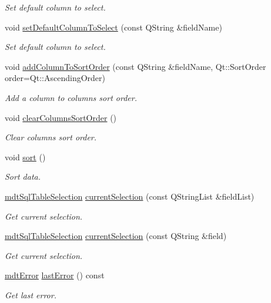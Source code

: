 \begin{DoxyCompactItemize}
\begin{DoxyCompactList}\small\item\em Set default column to select. \end{DoxyCompactList}\item 
void \hyperlink{classmdt_sql_table_widget_a17d60fda061030fdfe15be5445eadc76}{set\-Default\-Column\-To\-Select} (const Q\-String \&field\-Name)
\begin{DoxyCompactList}\small\item\em Set default column to select. \end{DoxyCompactList}\item 
void \hyperlink{classmdt_sql_table_widget_af15137a744ce87cb4b5009e2df9fca35}{add\-Column\-To\-Sort\-Order} (const Q\-String \&field\-Name, Qt\-::\-Sort\-Order order=Qt\-::\-Ascending\-Order)
\begin{DoxyCompactList}\small\item\em Add a column to columns sort order. \end{DoxyCompactList}\item 
void \hyperlink{classmdt_sql_table_widget_a54e2e47d9dffe0845e1748fb36c2ea7f}{clear\-Columns\-Sort\-Order} ()
\begin{DoxyCompactList}\small\item\em Clear columns sort order. \end{DoxyCompactList}\item 
void \hyperlink{classmdt_sql_table_widget_a5e1323816fce33680857048db8cbb255}{sort} ()
\begin{DoxyCompactList}\small\item\em Sort data. \end{DoxyCompactList}\item 
\hyperlink{classmdt_sql_table_selection}{mdt\-Sql\-Table\-Selection} \hyperlink{classmdt_sql_table_widget_a65f1bb0ebf82f73ef4a61e53ec4a26a7}{current\-Selection} (const Q\-String\-List \&field\-List)
\begin{DoxyCompactList}\small\item\em Get current selection. \end{DoxyCompactList}\item 
\hyperlink{classmdt_sql_table_selection}{mdt\-Sql\-Table\-Selection} \hyperlink{classmdt_sql_table_widget_adb4792d2ed64a9cce61bc429986ae9a1}{current\-Selection} (const Q\-String \&field)
\begin{DoxyCompactList}\small\item\em Get current selection. \end{DoxyCompactList}\item 
\hyperlink{classmdt_error}{mdt\-Error} \hyperlink{classmdt_sql_table_widget_a15ca772be92e80bbb964a72a8706fbeb}{last\-Error} () const 
\begin{DoxyCompactList}\small\item\em Get last error. \end{DoxyCompactList}\end{DoxyCompactItemize}


